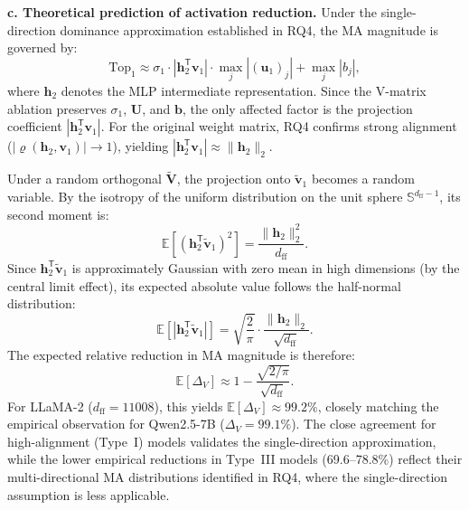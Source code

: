 \documentclass[conference]{IEEEtran}
\begin{document}
\smallskip
\noindent\textbf{c. Theoretical prediction of activation reduction.}
Under the single-direction dominance approximation established in RQ4, the MA magnitude is governed by:
\begin{equation}
\text{Top}_1 \approx \sigma_1 \cdot |\mathbf{h}_2^{\mathsf{T}} \mathbf{v}_1| \cdot \max_j |(\mathbf{u}_1)_j| + \max_j |b_j|,
\end{equation}
where $\mathbf{h}_2$ denotes the MLP intermediate representation. Since the V-matrix ablation preserves $\sigma_1$, $\mathbf{U}$, and $\mathbf{b}$, the only affected factor is the projection coefficient $|\mathbf{h}_2^{\mathsf{T}} \mathbf{v}_1|$. For the original weight matrix, RQ4 confirms strong alignment ($|\varrho(\mathbf{h}_2, \mathbf{v}_1)| \to 1$), yielding $|\mathbf{h}_2^{\mathsf{T}} \mathbf{v}_1| \approx \|\mathbf{h}_2\|_2$.

Under a random orthogonal $\tilde{\mathbf{V}}$, the projection onto $\tilde{\mathbf{v}}_1$ becomes a random variable. By the isotropy of the uniform distribution on the unit sphere $\mathbb{S}^{d_{\text{ff}}-1}$, its second moment is:
\begin{equation}
\mathbb{E}\!\left[(\mathbf{h}_2^{\mathsf{T}} \tilde{\mathbf{v}}_1)^2\right] = \frac{\|\mathbf{h}_2\|_2^2}{d_{\text{ff}}}.
\end{equation}
Since $\mathbf{h}_2^{\mathsf{T}} \tilde{\mathbf{v}}_1$ is approximately Gaussian with zero mean in high dimensions (by the central limit effect), its expected absolute value follows the half-normal distribution:
\begin{equation}
\mathbb{E}\!\left[|\mathbf{h}_2^{\mathsf{T}} \tilde{\mathbf{v}}_1|\right] = \sqrt{\frac{2}{\pi}} \cdot \frac{\|\mathbf{h}_2\|_2}{\sqrt{d_{\text{ff}}}}.
\end{equation}
The expected relative reduction in MA magnitude is therefore:
\begin{equation}
\mathbb{E}[\Delta_V] \approx 1 - \frac{\sqrt{2/\pi}}{\sqrt{d_{\text{ff}}}}.
\end{equation}
For LLaMA-2 ($d_{\text{ff}} = 11008$), this yields $\mathbb{E}[\Delta_V] \approx 99.2\%$, closely matching the empirical observation for Qwen2.5-7B ($\Delta_V = 99.1\%$). The close agreement for high-alignment (Type~I) models validates the single-direction approximation, while the lower empirical reductions in Type~III models (69.6--78.8\%) reflect their multi-directional MA distributions identified in RQ4, where the single-direction assumption is less applicable.
\end{document}
